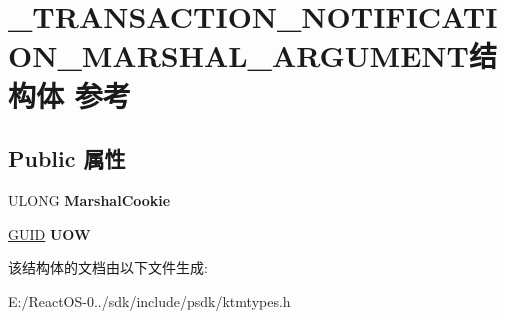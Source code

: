 \hypertarget{struct___t_r_a_n_s_a_c_t_i_o_n___n_o_t_i_f_i_c_a_t_i_o_n___m_a_r_s_h_a_l___a_r_g_u_m_e_n_t}{}\section{\+\_\+\+T\+R\+A\+N\+S\+A\+C\+T\+I\+O\+N\+\_\+\+N\+O\+T\+I\+F\+I\+C\+A\+T\+I\+O\+N\+\_\+\+M\+A\+R\+S\+H\+A\+L\+\_\+\+A\+R\+G\+U\+M\+E\+N\+T结构体 参考}
\label{struct___t_r_a_n_s_a_c_t_i_o_n___n_o_t_i_f_i_c_a_t_i_o_n___m_a_r_s_h_a_l___a_r_g_u_m_e_n_t}
\subsection*{Public 属性}
\begin{DoxyCompactItemize}
\item 
\mbox{\label{struct___t_r_a_n_s_a_c_t_i_o_n___n_o_t_i_f_i_c_a_t_i_o_n___m_a_r_s_h_a_l___a_r_g_u_m_e_n_t_a62f077227b9ddda9cca8fbb5d6b87c82}} 
U\+L\+O\+NG {\bfseries Marshal\+Cookie}
\item 
\mbox{\label{struct___t_r_a_n_s_a_c_t_i_o_n___n_o_t_i_f_i_c_a_t_i_o_n___m_a_r_s_h_a_l___a_r_g_u_m_e_n_t_a5161390deffb97eb96293afba80a3715}} 
\hyperlink{interface_g_u_i_d}{G\+U\+ID} {\bfseries U\+OW}
\end{DoxyCompactItemize}


该结构体的文档由以下文件生成\+:\begin{DoxyCompactItemize}
\item 
E\+:/\+React\+O\+S-\/0../sdk/include/psdk/ktmtypes.\+h\end{DoxyCompactItemize}
